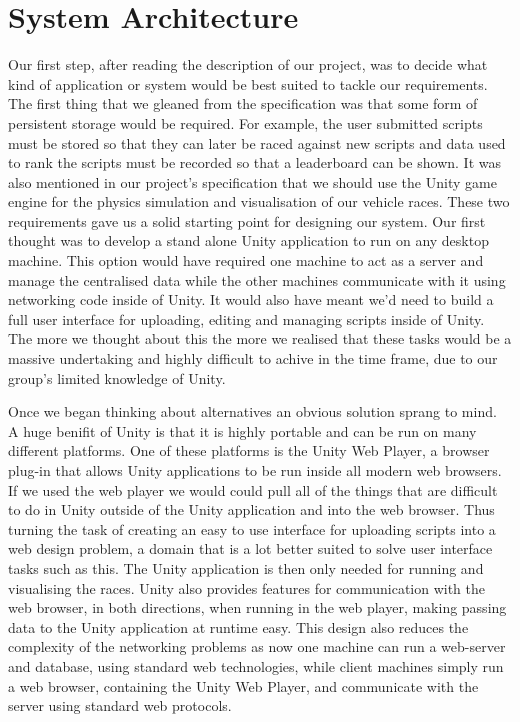 \section{System Architecture}

Our first step, after reading the description of our project, was to decide what kind of application or system would be best suited to tackle our requirements. The first thing that we gleaned from the specification was that some form of persistent storage would be required. For example, the user submitted scripts must be stored so that they can later be raced against new scripts and data used to rank the scripts must be recorded so that a leaderboard can be shown. It was also mentioned in our project's specification that we should use the Unity game engine for the physics simulation and visualisation of our vehicle races. These two requirements gave us a solid starting point for designing our system. Our first thought was to develop a stand alone Unity application to run on any desktop machine. This option would have required one machine to act as a server and manage the centralised data while the other machines communicate with it using networking code inside of Unity. It would also have meant we'd need to build a full user interface for uploading, editing and managing scripts inside of Unity. The more we thought about this the more we realised that these tasks would be a massive undertaking and highly difficult to achive in the time frame, due to our group's limited knowledge of Unity.

Once we began thinking about alternatives an obvious solution sprang to mind. A huge benifit of Unity is that it is highly portable and can be run on many different platforms. One of these platforms is the Unity Web Player, a browser plug-in that allows Unity applications to be run inside all modern web browsers. If we used the web player we would could pull all of the things that are difficult to do in Unity outside of the Unity application and into the web browser. Thus turning the task of creating an easy to use interface for uploading scripts into a web design problem, a domain that is a lot better suited to solve user interface tasks such as this. The Unity application is then only needed for running and visualising the races. Unity also provides features for communication with the web browser, in both directions, when running in the web player, making passing data to the Unity application at runtime easy. This design also reduces the complexity of the networking problems as now one machine can run a web-server and database, using standard web technologies, while client machines simply run a web browser, containing the Unity Web Player, and communicate with the server using standard web protocols.

